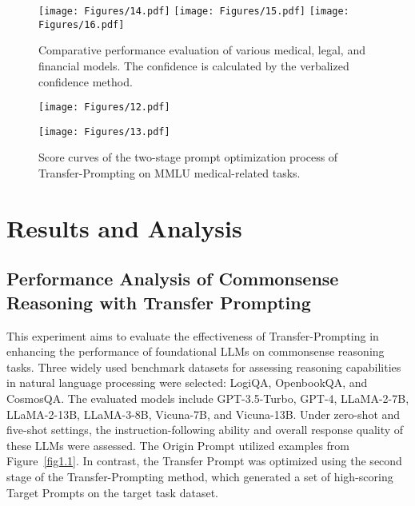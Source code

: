 
\begin{figure*}[!h]
\centering
\texttt{[image: Figures/14.pdf]} 
\hfill
\texttt{[image: Figures/15.pdf]} 
\hfill
\texttt{[image: Figures/16.pdf]} 
\caption{Comparative performance evaluation of various medical, legal, and financial models. The confidence is calculated by the verbalized confidence method.}
\label{fig-sensitive1}
\end{figure*}


\begin{figure}[!h]
\centering
\texttt{[image: Figures/12.pdf]}

\vspace*{1mm} 

\texttt{[image: Figures/13.pdf]}
\caption{Score curves of the two-stage prompt optimization process of Transfer-Prompting on MMLU medical-related tasks.}
\label{fig: source and target}
\end{figure}



\section{Results and Analysis}
\subsection{Performance Analysis of Commonsense Reasoning with Transfer Prompting}

This experiment aims to evaluate the effectiveness of Transfer-Prompting in enhancing the performance of foundational LLMs on commonsense reasoning tasks. Three widely used benchmark datasets for assessing reasoning capabilities in natural language processing were selected: LogiQA, OpenbookQA, and CosmosQA. The evaluated models include GPT-3.5-Turbo, GPT-4, LLaMA-2-7B, LLaMA-2-13B, LLaMA-3-8B, Vicuna-7B, and Vicuna-13B.
Under zero-shot and five-shot settings, the instruction-following ability and overall response quality of these LLMs were assessed. 
The Origin Prompt utilized examples from Figure~\ref{fig1.1}. In contrast, the Transfer Prompt was optimized using the second stage of the Transfer-Prompting method, which generated a set of high-scoring Target Prompts on the target task dataset.

